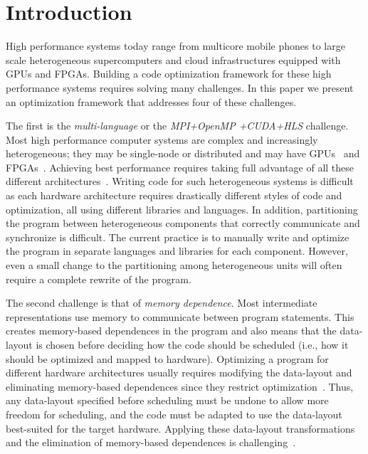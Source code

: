 \section{Introduction}
\label{sec:intro}

High performance systems today range from multicore mobile phones to large scale heterogeneous supercomputers and cloud infrastructures equipped with GPUs and FPGAs.  Building a code optimization framework for these high performance systems requires solving many challenges.  In this paper we present an optimization framework that addresses four of these challenges.

The first is the \emph{multi-language} or the \emph{MPI+OpenMP +CUDA+HLS} challenge.
Most high performance computer systems are complex and increasingly heterogeneous; they may be single-node or distributed and may have GPUs~\cite{liao2014milkyway} and FPGAs~\cite{caulfield2017configurable}.
Achieving best performance requires taking full advantage of all these different architectures~\cite{yang2011hybrid}.
Writing code for such heterogeneous systems is difficult as each hardware architecture requires drastically different styles of code and optimization, all using different libraries and languages.  In addition, partitioning the program between heterogeneous components that correctly communicate and synchronize is difficult.  The current practice is to manually write and optimize the program in separate languages and libraries for each component. However, even a small change to the partitioning among heterogeneous units will often require a complete rewrite of the program.

The second challenge is that of \emph{memory dependence}.  Most intermediate representations use memory to communicate between program statements.  This creates memory-based dependences in the program and also means that the data-layout is chosen before deciding how the code should be scheduled (i.e., how it should be optimized and mapped to hardware).  Optimizing a program for different hardware architectures usually requires modifying the data-layout and eliminating memory-based dependences since they restrict optimization~\cite{maydan1992data}.  Thus, any data-layout specified before scheduling must be undone to allow more freedom for scheduling, and the code must be adapted to use the data-layout best-suited for the target hardware.
Applying these data-layout transformations and the elimination of memory-based dependences is challenging~\cite{gupta1997privatization,autoPrivatPeng,li_array_1992,feautrier_array_1988,midkiff_automatic_2012,maydan_array-data_1993,lefebvre_automatic_1998,Qui00,Darte_contraction_2005}.

